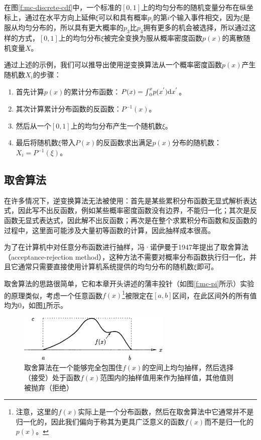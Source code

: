 在图\ref{f:mc-discrete-cdf}中，一个标准的$[0,1]$上的均匀分布的随机变量分布在纵坐标上，通过在水平方向上延伸$\xi$可以和具有概率$p_i$的第$i$个输入事件相交，因为$\xi$是服从均匀分布的，所以具有更大概率的$p_3$比$p_4$拥有更多的机会被选择，所以通过这样的方式，$[0,1]$上的均匀分布$\xi$被完全变换为服从概率密度函数$p(x)$的离散随机变量$X$。

通过上述的示例，我们可以推导出使用逆变换算法从一个概率密度函数$p(x)$产生随机数$X_i$的步骤：

\begin{enumerate}
	\item 首先计算$p(x)$的累计分布函数：$P(x)={\rm \int}_{0}^{x}p(x^{'}){\rm d}x^{'}$。
	\item 其次计算累计分布函数的反函数：$P^{-1}(x)$。
	\item 然后从一个$[0,1]$上的均匀分布产生一个随机数$\xi$。
	\item 最后将随机数$\xi$带入$P(x)$的反函数求出满足$p(x)$分布的随机数：$X_i=P^{-1}(\xi)$。
\end{enumerate}




\subsection{取舍算法}\label{sec:mc-accept-reject}
在许多情况下，逆变换算法无法被使用：首先是某些累积分布函数无显式解析表达式，因此写不出反函数，例如某些概率密度函数没有边界，不能归一化；其次是反函数无显式表达式，因此解不出反函数；再次是在整个求累积分布函数和反函数的过程中，这里面可能涉及大量初等函数的计算，因此抽样成本很高。

为了在计算机中对任意分布函数进行抽样，冯·诺伊曼于1947年提出了取舍算法（acceptance-rejection method），这种方法不需要对概率分布函数执行归一化，并且它通常只需要直接使用计算机系统提供的均匀分布的随机数$\xi$即可。

取舍算法的思路很简单，它和本章开头讲述的蒲丰投针（如图\ref{f:mc-pi}所示）实验的原理类似，考虑一个任意函数$f(x)$\footnote{注意，这里的$f(x)$实际上是一个分布函数，然后在取舍算法中它通常并不是归一化的，因此我们偏向于称其为更具广泛意义的函数$f(x)$而不是归一化的$p(x)$。}被限定在$[a,b]$区间，在此区间外的所有值均为0，如图\ref{f:mc-rejection-idea}所示。

\begin{figure}
\sidecaption
	\includegraphics[width=0.65\textwidth]{figures/mc/mc-6}
	\caption{取舍算法在一个能够完全包围住$f(x)$的空间上均匀抽样，然后选择（接受）处于函数$f(x)$范围内的抽样值用来作为抽样值，其他值则被抛弃（拒绝）}
	\label{f:mc-rejection-idea}
\end{figure}

